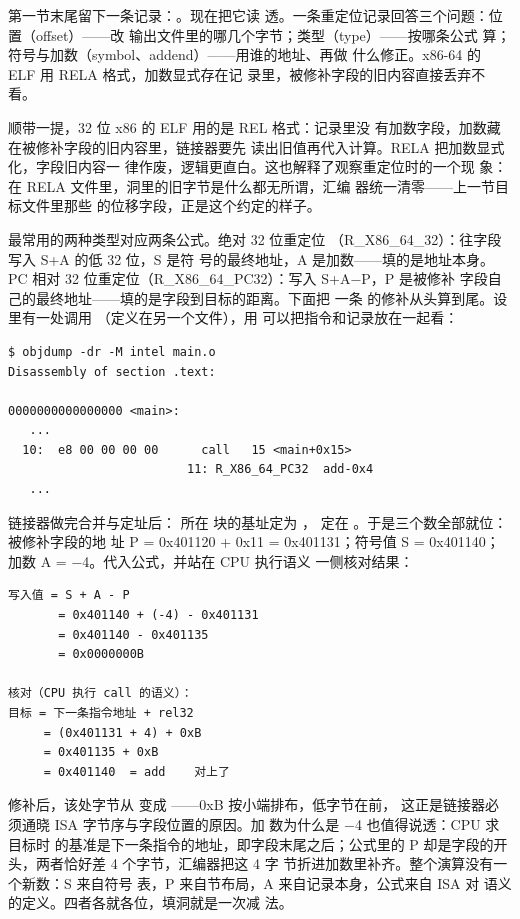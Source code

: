 第一节末尾留下一条记录：。现在把它读
透。一条重定位记录回答三个问题：位置（offset）——改
输出文件里的哪几个字节；类型（type）——按哪条公式
算；符号与加数（symbol、addend）——用谁的地址、再做
什么修正。x86-64 的 ELF 用 RELA 格式，加数显式存在记
录里，被修补字段的旧内容直接丢弃不看。

顺带一提，32 位 x86 的 ELF 用的是 REL 格式：记录里没
有加数字段，加数藏在被修补字段的旧内容里，链接器要先
读出旧值再代入计算。RELA 把加数显式化，字段旧内容一
律作废，逻辑更直白。这也解释了观察重定位时的一个现
象：在 RELA 文件里，洞里的旧字节是什么都无所谓，汇编
器统一清零——上一节目标文件里那些
 的位移字段，正是这个约定的样子。

最常用的两种类型对应两条公式。绝对 32 位重定位
（R\_X86\_64\_32）：往字段写入 S+A 的低 32 位，S 是符
号的最终地址，A 是加数——填的是地址本身。PC 相对 32
位重定位（R\_X86\_64\_PC32）：写入 S+A−P，P 是被修补
字段自己的最终地址——填的是字段到目标的距离。下面把
一条  的修补从头算到尾。设 
里有一处调用 （定义在另一个文件），用
 可以把指令和记录放在一起看：

\begin{lstlisting}
$ objdump -dr -M intel main.o
Disassembly of section .text:

0000000000000000 <main>:
   ...
  10:  e8 00 00 00 00      call   15 <main+0x15>
                         11: R_X86_64_PC32  add-0x4
   ...
\end{lstlisting}

链接器做完合并与定址后： 所在 
块的基址定为 ， 定在
。于是三个数全部就位：被修补字段的地
址 P = 0x401120 + 0x11 = 0x401131；符号值 S =
0x401140；加数 A = −4。代入公式，并站在 CPU 执行语义
一侧核对结果：

\begin{lstlisting}
写入值 = S + A - P
       = 0x401140 + (-4) - 0x401131
       = 0x401140 - 0x401135
       = 0x0000000B

核对（CPU 执行 call 的语义）：
目标 = 下一条指令地址 + rel32
     = (0x401131 + 4) + 0xB
     = 0x401135 + 0xB
     = 0x401140  = add    对上了
\end{lstlisting}

修补后，该处字节从  变成
——0xB 按小端排布，低字节在前，
这正是链接器必须通晓 ISA 字节序与字段位置的原因。加
数为什么是 −4 也值得说透：CPU 求  目标时
的基准是下一条指令的地址，即字段末尾之后；公式里的 P
却是字段的开头，两者恰好差 4 个字节，汇编器把这 4 字
节折进加数里补齐。整个演算没有一个新数：S 来自符号
表，P 来自节布局，A 来自记录本身，公式来自 ISA 对
 语义的定义。四者各就各位，填洞就是一次减
法。

